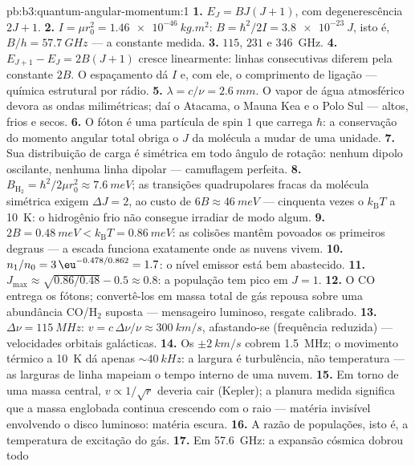 \begin{solution}{pb:b3:quantum-angular-momentum:1}
\textbf{1.} $E_J = BJ(J+1)$, com degenerescência $2J + 1$.
\textbf{2.} $I = \mu r_0^2 = \qty{1.46e-46}{kg.m^2}$: $B =
\hbar^2/2I = \qty{3.8e-23}{J}$, isto é, $B/h = \qty{57.7}{GHz}$ --- a
constante medida.
\textbf{3.} $115$, $231$ e \qty{346}{GHz}.
\textbf{4.} $E_{J+1} - E_J = 2B(J+1)$ cresce linearmente: linhas
consecutivas diferem pela constante $2B$. O espaçamento dá $I$ e, com
ele, o comprimento de ligação --- química estrutural por rádio.
\textbf{5.} $\lambda = c/\nu = \qty{2.6}{mm}$. O vapor de água
atmosférico devora as ondas milimétricas; daí o Atacama, o Mauna Kea e
o Polo Sul --- altos, frios e secos.
\textbf{6.} O fóton é uma partícula de spin $1$ que carrega $\hbar$: a
conservação do momento angular total obriga o $J$ da molécula a mudar
de uma unidade.
\textbf{7.} Sua distribuição de carga é simétrica em todo ângulo de
rotação: nenhum dipolo oscilante, nenhuma linha dipolar --- camuflagem
perfeita.
\textbf{8.} $B_{\text{H}_2} = \hbar^2/2\mu r_0^2 \approx
\qty{7.6}{meV}$; as transições quadrupolares fracas da molécula
simétrica exigem $\Delta J = 2$, ao custo de $6B \approx
\qty{46}{meV}$ --- cinquenta vezes o $k_{\text{B}}T$ a \qty{10}{K}: o
hidrogênio frio não consegue irradiar de modo algum.
\textbf{9.} $2B = \qty{0.48}{meV} < k_{\text{B}}T = \qty{0.86}{meV}$:
as colisões mantêm povoados os primeiros degraus --- a escada funciona
exatamente onde as nuvens vivem.
\textbf{10.} $n_1/n_0 = 3\,\eu^{-0.478/0.862} = 1.7$: o nível emissor
está bem abastecido.
\textbf{11.} $J_{\max} \approx \sqrt{0.86/0.48} - 0.5 \approx 0.8$: a
população tem pico em $J = 1$.
\textbf{12.} O CO entrega os fótons; convertê-los em massa total de gás
repousa sobre uma abundância CO/H$_2$ suposta --- mensageiro luminoso,
resgate calibrado.
\textbf{13.} $\Delta\nu = \qty{115}{MHz}$: $v = c\,\Delta\nu/\nu
\approx \qty{300}{km/s}$, afastando-se (frequência reduzida) ---
velocidades orbitais galácticas.
\textbf{14.} Os $\pm\qty{2}{km/s}$ cobrem \qty{1.5}{MHz}; o movimento
térmico a \qty{10}{K} dá apenas $\sim\qty{40}{kHz}$: a largura é
turbulência, não temperatura --- as larguras de linha mapeiam o tempo
interno de uma nuvem.
\textbf{15.} Em torno de uma massa central, $v \propto 1/\sqrt r$
deveria cair (Kepler); a planura medida significa que a massa
englobada continua crescendo com o raio --- matéria invisível
envolvendo o disco luminoso: matéria escura.
\textbf{16.} A razão de populações, isto é, a temperatura de excitação
do gás.
\textbf{17.} Em \qty{57.6}{GHz}: a expansão cósmica dobrou todo

\end{solution}

